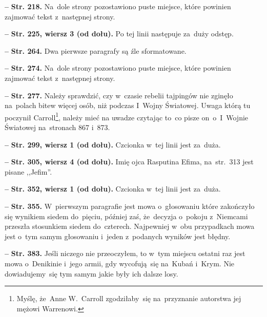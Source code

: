 \documentclass[a4paper,11pt]{article}
\newcommand{\spaceFour}{0.5em}
\newcommand{\tb}{\textbf}
\newcommand{\noi}{\noindent}
\newcommand{\start}{\noi \tb{--} {}}
\newcommand{\Str}[1]{\tb{Str. #1.}}
\newcommand{\StrWd}[2]{\tb{Str. #1, wiersz #2 (od dołu).}}
\begin{document}
\vspace{\spaceFour}


\start \Str{218} Na~dole strony pozostawiono puste miejsce, które
powinien zajmować tekst z~następnej strony.

\vspace{\spaceFour}


\start \StrWd{225}{3} Po tej linii następuje za~duży odstęp.

\vspace{\spaceFour}


\start \Str{264} Dwa pierwsze paragrafy są źle sformatowane.

\vspace{\spaceFour}


\start \Str{274} Na~dole strony pozostawiono puste miejsce, które
powinien zajmować tekst z~następnej strony.

\vspace{\spaceFour}


\start \Str{277} Należy sprawdzić, czy w~czasie rebelii tajpingów nie
zginęło na~polach bitew więcej osób, niż podczas I~Wojny Światowej.
Uwaga którą tu poczynił Carroll\footnote{Myślę, że~Anne W.~Carroll
  zgodziłaby~się na~przyznanie autorstwa jej mężowi Warrenowi.},
należy mieć na uwadze czytając to~co pisze on~o~I~Wojnie Światowej
na~stronach 867 i~873.

\vspace{\spaceFour}


\start \StrWd{299}{1} Czcionka w~tej linii jest za~duża.

\vspace{\spaceFour}


\start \StrWd{305}{4} Imię ojca Rasputina Efima, na~str.~313 jest
pisane ,,Jefim''.

\vspace{\spaceFour}


\start \StrWd{352}{1} Czcionka w~tej linii jest za~duża.

\vspace{\spaceFour}


\start \Str{355} W~pierwszym paragrafie jest mowa o~głosowaniu które
zakończyło się wynikiem siedem do~pięciu, później zaś, że~decyzja
o~pokoju z~Niemcami przeszła stosunkiem siedem do~czterech. Najpewniej
w~obu przypadkach mowa jest o~tym samym głosowaniu i~jeden z~podanych
wyników jest błędny.

\vspace{\spaceFour}


\start \Str{383} Jeśli niczego nie przeoczyłem, to w~tym miejscu
ostatni raz jest mowa o~Denikinie i~jego armii, gdy wycofują~się
na~Kubań i~Krym. Nie dowiadujemy~się tym samym jakie były ich dalsze
losy.
\end{document}

